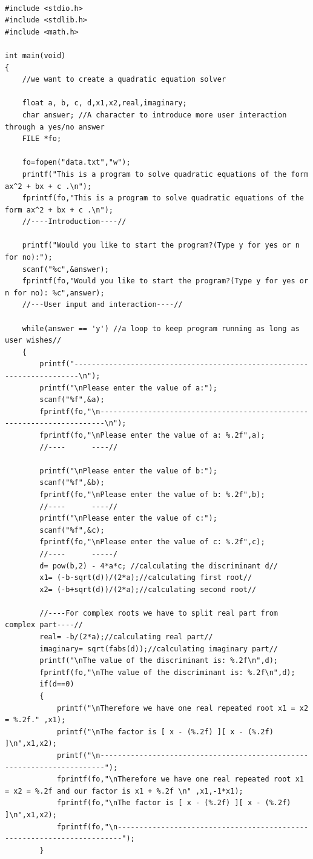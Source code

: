 \documentclass[letterpaper, 24pt, final, onecolumn, titlepage] {article}
\begin{document}
\begin{lstlisting}

#include <stdio.h>
#include <stdlib.h>
#include <math.h>

int main(void)
{
    //we want to create a quadratic equation solver

    float a, b, c, d,x1,x2,real,imaginary;
    char answer; //A character to introduce more user interaction through a yes/no answer
    FILE *fo;

    fo=fopen("data.txt","w");
    printf("This is a program to solve quadratic equations of the form ax^2 + bx + c .\n");
    fprintf(fo,"This is a program to solve quadratic equations of the form ax^2 + bx + c .\n");
    //----Introduction----//

    printf("Would you like to start the program?(Type y for yes or n for no):");
    scanf("%c",&answer);
    fprintf(fo,"Would you like to start the program?(Type y for yes or n for no): %c",answer);
    //---User input and interaction----//

    while(answer == 'y') //a loop to keep program running as long as user wishes//
    {
        printf("-----------------------------------------------------------------------\n");
        printf("\nPlease enter the value of a:");
        scanf("%f",&a);
        fprintf(fo,"\n-----------------------------------------------------------------------\n");
        fprintf(fo,"\nPlease enter the value of a: %.2f",a);
        //----      ----//

        printf("\nPlease enter the value of b:");
        scanf("%f",&b);
        fprintf(fo,"\nPlease enter the value of b: %.2f",b);
        //----      ----//
        printf("\nPlease enter the value of c:");
        scanf("%f",&c);
        fprintf(fo,"\nPlease enter the value of c: %.2f",c);
        //----      -----/
        d= pow(b,2) - 4*a*c; //calculating the discriminant d//
        x1= (-b-sqrt(d))/(2*a);//calculating first root//
        x2= (-b+sqrt(d))/(2*a);//calculating second root//

        //----For complex roots we have to split real part from complex part----//
        real= -b/(2*a);//calculating real part//
        imaginary= sqrt(fabs(d));//calculating imaginary part//
        printf("\nThe value of the discriminant is: %.2f\n",d);
        fprintf(fo,"\nThe value of the discriminant is: %.2f\n",d);
        if(d==0)
        {
            printf("\nTherefore we have one real repeated root x1 = x2 = %.2f." ,x1);
            printf("\nThe factor is [ x - (%.2f) ][ x - (%.2f) ]\n",x1,x2);
            printf("\n-----------------------------------------------------------------------");
            fprintf(fo,"\nTherefore we have one real repeated root x1 = x2 = %.2f and our factor is x1 + %.2f \n" ,x1,-1*x1);
            fprintf(fo,"\nThe factor is [ x - (%.2f) ][ x - (%.2f) ]\n",x1,x2);
            fprintf(fo,"\n-----------------------------------------------------------------------");
        }


\end{lstlisting}
\end{document}
